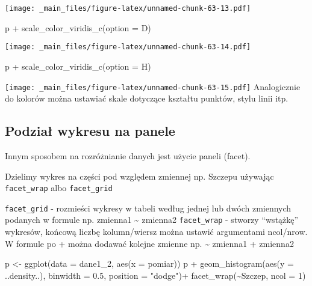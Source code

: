 \documentclass[
]{book}
\newenvironment{Shaded}{\begin{snugshade}}{\end{snugshade}}
\newcommand{\AttributeTok}[1]{\textcolor[rgb]{0.77,0.63,0.00}{#1}}
\newcommand{\DecValTok}[1]{\textcolor[rgb]{0.00,0.00,0.81}{#1}}
\newcommand{\FloatTok}[1]{\textcolor[rgb]{0.00,0.00,0.81}{#1}}
\newcommand{\FunctionTok}[1]{\textcolor[rgb]{0.00,0.00,0.00}{#1}}
\newcommand{\NormalTok}[1]{#1}
\newcommand{\OtherTok}[1]{\textcolor[rgb]{0.56,0.35,0.01}{#1}}
\newcommand{\SpecialCharTok}[1]{\textcolor[rgb]{0.00,0.00,0.00}{#1}}
\newcommand{\StringTok}[1]{\textcolor[rgb]{0.31,0.60,0.02}{#1}}
\begin{document}
\texttt{[image: \_main\_files/figure-latex/unnamed-chunk-63-13.pdf]}

\begin{Shaded}
\begin{Highlighting}[]
\NormalTok{p }\SpecialCharTok{+} \FunctionTok{scale\_color\_viridis\_c}\NormalTok{(}\AttributeTok{option =} \StringTok{\textquotesingle{}D\textquotesingle{}}\NormalTok{)}
\end{Highlighting}
\end{Shaded}

\texttt{[image: \_main\_files/figure-latex/unnamed-chunk-63-14.pdf]}

\begin{Shaded}
\begin{Highlighting}[]
\NormalTok{p }\SpecialCharTok{+} \FunctionTok{scale\_color\_viridis\_c}\NormalTok{(}\AttributeTok{option =} \StringTok{\textquotesingle{}H\textquotesingle{}}\NormalTok{)}
\end{Highlighting}
\end{Shaded}

\texttt{[image: \_main\_files/figure-latex/unnamed-chunk-63-15.pdf]}
Analogicznie do kolorów można ustawiać skale dotyczące kształtu punktów, stylu linii itp.

\hypertarget{podziaux142-wykresu-na-panele}{%
\subsection{Podział wykresu na panele}\label{podziaux142-wykresu-na-panele}}

Innym sposobem na rozróżnianie danych jest użycie paneli (facet).

Dzielimy wykres na części pod względem zmiennej np. Szczepu używając \texttt{facet\_wrap} albo \texttt{facet\_grid}

\texttt{facet\_grid} - rozmieści wykresy w tabeli według jednej lub dwóch zmiennych podanych w formule np. zmienna1 \textasciitilde{} zmienna2
\texttt{facet\_wrap} - stworzy ``wstążkę'' wykresów, końcową liczbę kolumn/wiersz można ustawić argumentami ncol/nrow. W formule po + można dodawać kolejne zmienne np. \textasciitilde{} zmienna1 + zmienna2

\begin{Shaded}
\begin{Highlighting}[]
\NormalTok{p }\OtherTok{\textless{}{-}} \FunctionTok{ggplot}\NormalTok{(}\AttributeTok{data =}\NormalTok{ dane1\_2, }\FunctionTok{aes}\NormalTok{(}\AttributeTok{x =}\NormalTok{ pomiar))}
\NormalTok{p }\SpecialCharTok{+} \FunctionTok{geom\_histogram}\NormalTok{(}\FunctionTok{aes}\NormalTok{(}\AttributeTok{y =}\NormalTok{ ..density..), }\AttributeTok{binwidth =} \FloatTok{0.5}\NormalTok{, }\AttributeTok{position =} \StringTok{"dodge"}\NormalTok{)}\SpecialCharTok{+}
  \FunctionTok{facet\_wrap}\NormalTok{(}\SpecialCharTok{\textasciitilde{}}\NormalTok{Szczep, }\AttributeTok{ncol =} \DecValTok{1}\NormalTok{)}
\end{Highlighting}
\end{Shaded}
\end{document}
